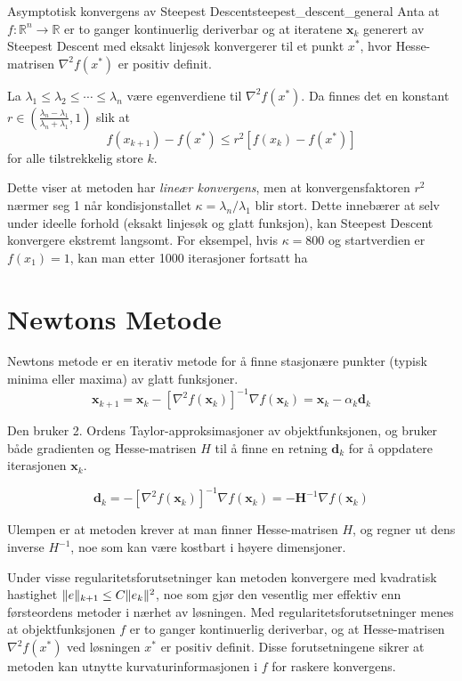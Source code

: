 \begin{theorem}{Asymptotisk konvergens av Steepest Descent}{steepest_descent_general}
	Anta at \(f : \mathbb{R}^n \to \mathbb{R}\) er to ganger kontinuerlig deriverbar og at iteratene \(\symbf{x}_k\) generert av Steepest Descent med eksakt linjesøk konvergerer til et punkt \(x^\ast\), hvor Hesse-matrisen \(\nabla^2 f(x^\ast)\) er positiv definit.

	La \(\lambda_1 \leq \lambda_2 \leq \cdots \leq \lambda_n\) være egenverdiene til \(\nabla^2 f(x^\ast)\). Da finnes det en konstant \(r \in \left( \frac{\lambda_n - \lambda_1}{\lambda_n + \lambda_1}, 1 \right)\) slik at
	\[
		f(x_{k+1}) - f(x^\ast) \leq r^2 \left[ f(x_k) - f(x^\ast) \right]
	\]
	for alle tilstrekkelig store \(k\).
\end{theorem}

Dette viser at metoden har \emph{lineær konvergens}, men at konvergensfaktoren \(r^2\) nærmer seg 1 når kondisjonstallet \(\kappa = \lambda_n / \lambda_1\) blir stort. Dette innebærer at selv under ideelle forhold (eksakt linjesøk og glatt funksjon), kan Steepest Descent konvergere ekstremt langsomt. For eksempel, hvis \(\kappa = 800\) og startverdien er \(f(x_1) = 1\), kan man etter 1000 iterasjoner fortsatt ha

\section{Newtons Metode}
\label{sec:newtons_method}
Newtons metode er en iterativ metode for å finne stasjonære punkter (typisk minima eller maxima) av glatt funksjoner.
\[
	\mathbf{x}_{k+1} = \mathbf{x}_k - [\nabla^2 f(\mathbf{x}_k)]^{-1} \nabla f(\mathbf{x}_k) = \mathbf{x}_k - \alpha_k \mathbf{d}_k
\]\label{eq:newtons_method}

Den bruker 2. Ordens Taylor-approksimasjoner av objektfunksjonen, og bruker både gradienten og Hesse-matrisen $H$ til å finne en retning $\symbf{d}_k$ for å oppdatere iterasjonen $\symbf{x}_k$.

\[
	\symbf{d}_k = -[\nabla^2 f(\symbf{x}_k)]^{-1} \nabla f(\symbf{x}_k) = -\symbf{H}^{-1} \nabla f(\symbf{x}_k)
\]

Ulempen er at metoden krever at man finner Hesse-matrisen $H$, og regner ut dens inverse $H^{-1}$, noe som kan være kostbart i høyere dimensjoner.

Under visse regularitetsforutsetninger kan metoden konvergere med kvadratisk hastighet $\lVert e\rVert_{k+1} \leq C \lVert e_k\rVert^2$, noe som gjør den vesentlig mer effektiv enn førsteordens metoder i nærhet av løsningen.
Med regularitetsforutsetninger menes at objektfunksjonen $f$ er to ganger kontinuerlig deriverbar, og at Hesse-matrisen $\nabla^2 f(x^\ast)$ ved løsningen $x^\ast$ er positiv definit.
Disse forutsetningene sikrer at metoden kan utnytte kurvaturinformasjonen i $f$ for raskere konvergens.

